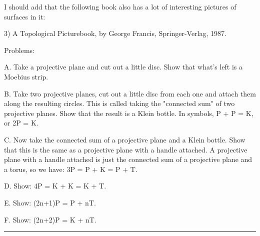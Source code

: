 I should add that the following book also has a lot of interesting
pictures of surfaces in it:

3) A Topological Picturebook, by George Francis, Springer-Verlag, 1987.

Problems:
                   
A. Take a projective plane and cut out a little disc.  Show that what's
left is a Moebius strip.
                   
B. Take two projective planes, cut out a little disc from each one and
attach them along the resulting circles.  This is called taking the
"connected sum" of two projective planes.  Show that the result is a
Klein bottle.  In symbols, P + P = K, or 2P = K.
                  
C. Now take the connected sum of a projective plane and a Klein bottle.
Show that this is the same as a projective plane with a handle attached.
A projective plane with a handle attached is just the connected sum of a
projective plane and a torus, so we have: 3P = P + K = P + T.
                 
D. Show:  4P = K + K = K + T.
                 
E. Show: (2n+1)P = P + nT.
                 
F. Show: (2n+2)P = K + nT.
\par\noindent\rule{\textwidth}{0.4pt}

